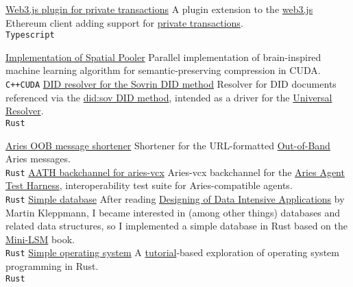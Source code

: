 \documentclass[9pt]{developercv} %
\begin{document}
\begin{entrylist}
	\entry
		{}
		{\href{https://github.com/mirgee/web3-plugin-private}{Web3.js plugin for private transactions}}
		{}
    {A plugin extension to the \href{https://github.com/web3/web3.js}{web3.js} Ethereum client adding support for \href{https://besu.hyperledger.org/development/private-networks/concepts/privacy/private-transactions}{private transactions}.\\
         \texttt{Typescript}}

	\entry
		{}
		{\href{https://github.com/mirgee/sp_cuda}{Implementation of Spatial Pooler}}
		{}
		{Parallel implementation of brain-inspired machine learning algorithm for semantic-preserving compression in CUDA.
          \\\texttt{C++}\slashsep\texttt{CUDA}
        }
	\entry
		{}
		{\href{https://github.com/AbsaOSS/driver-did-sov}{DID resolver for the Sovrin DID method}}
		{}
    {Resolver for DID documents referenced via the \href{https://sovrin-foundation.github.io/sovrin/spec/did-method-spec-template.html}{did:sov DID method}, intended as a driver for the \href{https://github.com/decentralized-identity/universal-resolver}{Universal Resolver}.\\
         \texttt{Rust}}

	\entry
		{}
		{\href{https://github.com/AbsaOSS/aries-oob-shortener}{Aries OOB message shortener}}
		{}
    {Shortener for the URL-formatted \href{https://github.com/hyperledger/aries-rfcs/blob/main/features/0434-outofband/README.md}{Out-of-Band} Aries messages.\\
         \texttt{Rust}}
	\entry
		{}
		{\href{https://github.com/hyperledger/aries-agent-test-harness/tree/main/aries-backchannels/aries-vcx}{AATH backchannel for aries-vcx}}
		{}
    {Aries-vcx backchannel for the \href{https://github.com/hyperledger/aries-agent-test-harness/}{Aries Agent Test Harness}, interoperability test suite for Aries-compatible agents.\\
         \texttt{Rust}}
	\entry
		{}
		{\href{https://github.com/mirgee/mini-lsm}{Simple database}}
		{}
    {After reading \href{https://www.goodreads.com/en/book/show/23463279-designing-data-intensive-applications}{Designing of Data Intensive Applications} by Martin Kleppmann, I became interested in (among other things) databases and related data structures, so I implemented a simple database in Rust based on the \href{https://skyzh.github.io/mini-lsm/}{Mini-LSM} book.\\
         \texttt{Rust}}
	\entry
		{}
		{\href{https://github.com/mirgee/rust-os}{Simple operating system}}
		{}
    {A \href{https://os.phil-opp.com/}{tutorial}-based exploration of operating system programming in Rust.\\
         \texttt{Rust}}


\end{entrylist}
\end{document}
